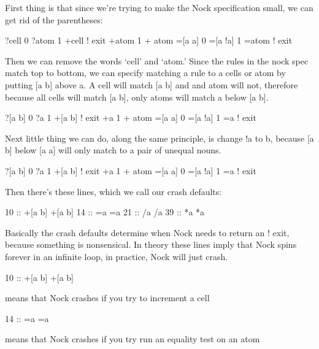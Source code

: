 First thing is that since we're trying to make the Nock specification small, we can get rid of the parentheses:

\begin{code}
?cell               0
?atom               1
+cell               ! exit
+atom               1 + atom
=[a a]              0
=[a !a]             1
=atom               ! exit

\end{code}
Then we can remove the words `cell' and `atom.' Since the rules in the nock spec match top to bottom, we can specify matching a rule to a cells or atom by putting [a b] above a. A cell will match [a b] and and atom will not, therefore because all cells will match [a b],
only atoms will match a below [a b].

\begin{code}
?[a b]             0
?a                 1
+[a b]             ! exit
+a                 1 + atom
=[a a]             0
=[a !a]            1
=a                 ! exit

\end{code}

Next little thing we can do, along the same principle, is change !a to b, because [a b] below [a a] will only match to a pair of unequal nouns.

\begin{code}
?[a b]             0
?a                 1
+[a b]             ! exit
+a                 1 + atom
=[a a]             0
=[a !a]            1
=a                 ! exit
\end{code}
Then there's these lines, which we call our crash defaults:

\begin{code}
10 ::    +[a b]           +[a b]
14 ::    =a               =a
21 ::    /a               /a
39 ::    *a               *a
\end{code}
Basically the crash defaults determine when Nock needs to return an ! exit, because something is nonsensical. In theory these lines imply that Nock spins forever in an infinite loop, in practice, Nock will just crash.

\begin{code}
10 ::    +[a b]           +[a b]

\end{code}
means that Nock crashes if you try to increment a cell

\begin{code}
14 ::    =a               =a
\end{code}
means that Nock crashes if you try run an equality test on an atom

